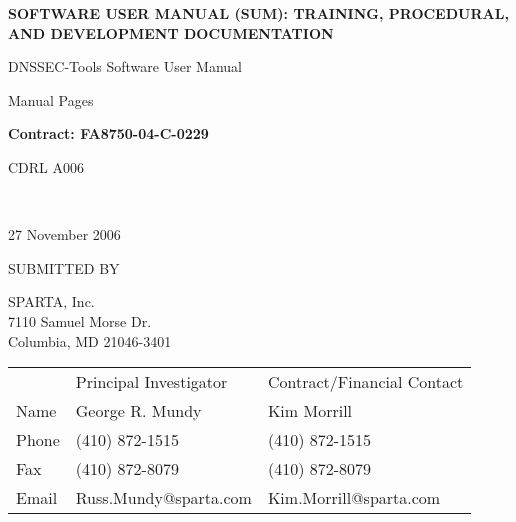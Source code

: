 \documentclass[12pt]{article}
\begin{document}

\begin{titlepage}

\vspace{.5in}

\begin{center}
\LARGE{\bf
SOFTWARE USER MANUAL (SUM):
TRAINING, PROCEDURAL, AND
DEVELOPMENT DOCUMENTATION
}
\vspace{1in}

\Large{
DNSSEC-Tools Software User Manual

Manual Pages
\vspace{0.5in}

{\bf Contract: FA8750-04-C-0229
\vspace{0.125in}

CDRL A006}\\
}
27 November 2006
\end{center}

\vspace{.5in}

SUBMITTED BY

SPARTA, Inc.\\
7110 Samuel Morse Dr.\\
Columbia, MD 21046-3401
\vspace{0.25in}

\begin{table}[hb]
\begin{tabular}{lll}
	& Principal Investigator	& Contract/Financial Contact\\
Name	& George R. Mundy		& Kim Morrill\\
Phone	& (410) 872-1515		& (410) 872-1515\\
Fax	& (410) 872-8079		& (410) 872-8079\\
Email	& Russ.Mundy@sparta.com		& Kim.Morrill@sparta.com\\
\end{tabular}
\end{table}

\end{titlepage}


\end{document}
